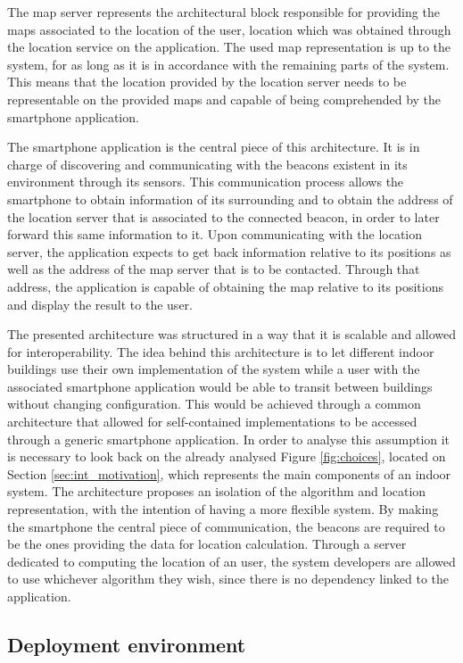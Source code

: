  
The map server represents the architectural block responsible for providing the maps associated to the location of the user, location which was obtained through the location service on the application. The used map representation is up to the system, for as long as it is in accordance with the remaining parts of the system. This means that the location provided by the location server needs to be representable on the provided maps and capable of being comprehended by the smartphone application.  
 
 
The smartphone application is the central piece of this architecture. It is in charge of discovering and communicating with the beacons existent in its environment through its sensors. This communication process allows the smartphone to obtain information of its surrounding and to obtain the address of the location server that is associated to the connected beacon, in order to later forward this same information to it. Upon communicating with the location server, the application expects to get back information relative to its positions as well as the address of the map server that is to be contacted. Through that address, the application is capable of obtaining the map relative to its positions and display the result to the user. 
 
 
The presented architecture was structured in a way that it is scalable and allowed for interoperability. The idea behind this architecture is to let different indoor buildings use their own implementation of the system while a user with the associated smartphone application would be able to transit between buildings without changing configuration. This would be achieved through a common architecture that allowed for self-contained implementations to be accessed through a generic smartphone application. In order to analyse this assumption it is necessary to look back on the already analysed Figure \ref{fig:choices}, located on Section \ref{sec:int_motivation}, which represents the main components of an indoor system. The architecture proposes an isolation of the algorithm and location representation, with the intention of having a more flexible system. By making the smartphone the central piece of communication, the beacons are required to be the ones providing the data for location calculation. Through a server dedicated to computing the location of an user, the system developers are allowed to use whichever algorithm they wish, since there is no dependency linked to the application.  
 
 
\subsection{Deployment environment} 
\label{subsec:deployment} 
 
